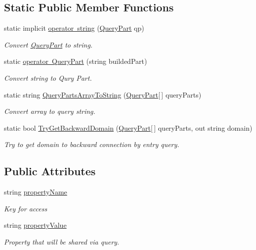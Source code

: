 \subsection*{Static Public Member Functions}
\begin{DoxyCompactItemize}
\item 
static implicit \mbox{\hyperlink{struct_uniform_queries_1_1_query_part_a274b321f91ecbda08f01c23536a568b6}{operator string}} (\mbox{\hyperlink{struct_uniform_queries_1_1_query_part}{Query\+Part}} qp)
\begin{DoxyCompactList}\small\item\em Convert \mbox{\hyperlink{struct_uniform_queries_1_1_query_part}{Query\+Part}} to string. \end{DoxyCompactList}\item 
static \mbox{\hyperlink{struct_uniform_queries_1_1_query_part_ab0c6ca9b91045a64286bf730ad97dc43}{operator Query\+Part}} (string builded\+Part)
\begin{DoxyCompactList}\small\item\em Convert string to Qury Part. \end{DoxyCompactList}\item 
static string \mbox{\hyperlink{struct_uniform_queries_1_1_query_part_a053c8ba08ddd1a20d5b50128a524da09}{Query\+Parts\+Array\+To\+String}} (\mbox{\hyperlink{struct_uniform_queries_1_1_query_part}{Query\+Part}}\mbox{[}$\,$\mbox{]} query\+Parts)
\begin{DoxyCompactList}\small\item\em Convert array to query string. \end{DoxyCompactList}\item 
static bool \mbox{\hyperlink{struct_uniform_queries_1_1_query_part_accd3b435809c426dd92456ffee0a996d}{Try\+Get\+Backward\+Domain}} (\mbox{\hyperlink{struct_uniform_queries_1_1_query_part}{Query\+Part}}\mbox{[}$\,$\mbox{]} query\+Parts, out string domain)
\begin{DoxyCompactList}\small\item\em Try to get domain to backward connection by entry query. \end{DoxyCompactList}\end{DoxyCompactItemize}
\subsection*{Public Attributes}
\begin{DoxyCompactItemize}
\item 
string \mbox{\hyperlink{struct_uniform_queries_1_1_query_part_a941540a3d1489c7f32cb5e21910ba7ac}{property\+Name}}
\begin{DoxyCompactList}\small\item\em Key for access \end{DoxyCompactList}\item 
string \mbox{\hyperlink{struct_uniform_queries_1_1_query_part_adb297c368ab4900f751d60ceffda0a99}{property\+Value}}
\begin{DoxyCompactList}\small\item\em Property that will be shared via query. \end{DoxyCompactList}\end{DoxyCompactItemize}
